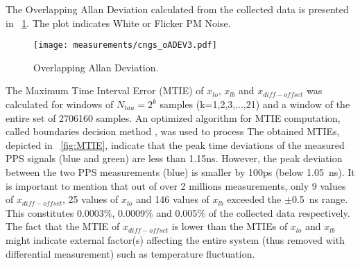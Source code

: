 The Overlapping Allan Deviation calculated from the collected data is presented in 
\figurename~\ref{fig:oADEV}. The plot indicates White or Flicker PM Noise. 

\begin{figure}[!t]
\centering
\texttt{[image: measurements/cngs\_oADEV3.pdf]}
\caption{Overlapping Allan Deviation.}
\label{fig:oADEV}
\end{figure}

% 

The Maximum Time Interval Error (MTIE) of $x_{lo}$, $x_{lb}$ and $x_{diff-offset}$ 
was calculated for windows of $N_{tau}=2^k$ samples (k=1,2,3,...,21) and a window of the entire 
set of 2706160 samples. An optimized algorithm for MTIE
computation, called boundaries decision method \cite{biblio:MTIE}, was used to process 
The obtained MTIEs, depicted in \figurename~\ref{fig:MTIE},
indicate that the peak time deviations of the measured PPS signals (blue and green) are less than 1.15ns. 
However, the peak deviation between the two PPS measurements (blue) is smaller by 100ps 
(below 1.05~ns). It is important to mention that out of over 
2 millions measurements, only 9 values of $x_{diff-offset}$, 25 values of $x_{lo}$ and 146 values of 
$x_{lb}$ exceeded the $\pm$0.5~ns range. This constitutes 
0.0003$\%$, 0.0009$\%$ and 0.005$\%$ of the collected data respectively. The fact that the 
MTIE of $x_{diff-offset}$ is lower than the MTIEs of $x_{lo}$ and $x_{lb}$ might indicate 
external factor(s) affecting the entire system (thus removed with differential measurement) such
as temperature fluctuation.


